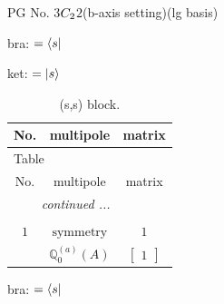 \documentclass[fleqn,8pt,landscape]{jsarticle}
\begin{document}
\setcounter{MaxMatrixCols}{32}

\renewcommand{\tablename}{Table~}
\renewcommand{\figurename}{Figure~}
\begin{center}
\LARGE
PG No. 3\quad$C_{\rm 2}$\quad$2$\quad(b-axis setting)\quad[ monoclinic ] (lg basis)
\end{center}
bra: $=\bra{s}$

\noindent
ket: $=\ket{s}$
\renewcommand{\arraystretch}{1.6}
\begin{longtable}{ccc}
\caption{(s,s) block.}
 \\
 \hline \hline
No. & multipole & matrix \\ \hline \endfirsthead

\multicolumn{2}{l}{\tablename\ \thetable{}} \\
 \hline \hline
No. & multipole & matrix \\ \hline \endhead

 \hline \hline
\multicolumn{2}{r}{\footnotesize\it continued ...} \\ \endfoot

 \hline \hline
\multicolumn{2}{r}{} \\ \endlastfoot

$ 1 $ & $ \text{symmetry} $ & $ 1 $ \\
$  $ & $ \mathbb{Q}_{0}^{(a)}(A) $ & $ \begin{bmatrix} 1 \end{bmatrix} $ \\ \hline
\end{longtable}
bra: $=\bra{s}$
\end{document}
